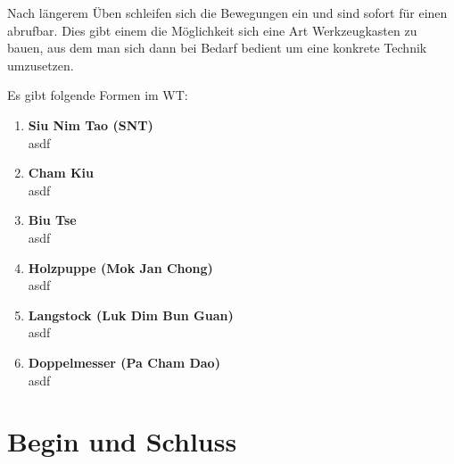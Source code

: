 Nach l\"angerem \"Uben schleifen sich die Bewegungen ein und sind sofort f\"ur einen abrufbar. Dies gibt einem die M\"oglichkeit sich eine Art Werkzeugkasten zu bauen, aus dem man sich dann bei Bedarf bedient um eine konkrete Technik umzusetzen.






\begin{flushleft}
	Es gibt folgende Formen im WT:
\end{flushleft}

\begin{enumerate}
	\item \textbf{Siu Nim Tao (SNT)} \\ asdf
	\item \textbf{Cham Kiu} \\ asdf
	\item \textbf{Biu Tse} \\ asdf
	\item \textbf{Holzpuppe (Mok Jan Chong)} \\ asdf
	\item \textbf{Langstock (Luk Dim Bun Guan)} \\ asdf
	\item \textbf{Doppelmesser (Pa Cham Dao)} \\ asdf
\end{enumerate}

\newpage


\section*{Begin und Schluss}

